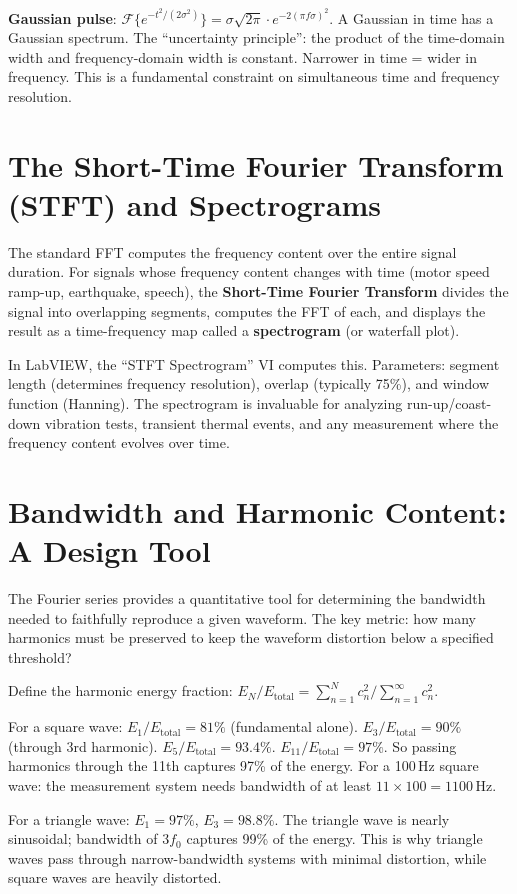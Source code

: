 \documentclass[11pt,letterpaper,twoside,openany]{book}
\begin{document}
\textbf{Gaussian pulse}: $\mathcal{F}\{e^{-t^2/(2\sigma^2)}\} = \sigma\sqrt{2\pi} \cdot e^{-2(\pi f\sigma)^2}$. A Gaussian in time has a Gaussian spectrum. The ``uncertainty principle'': the product of the time-domain width and frequency-domain width is constant. Narrower in time = wider in frequency. This is a fundamental constraint on simultaneous time and frequency resolution.

\section{The Short-Time Fourier Transform (STFT) and Spectrograms}
The standard FFT computes the frequency content over the entire signal duration. For signals whose frequency content changes with time (motor speed ramp-up, earthquake, speech), the \textbf{Short-Time Fourier Transform} divides the signal into overlapping segments, computes the FFT of each, and displays the result as a time-frequency map called a \textbf{spectrogram} (or waterfall plot).

In LabVIEW, the ``STFT Spectrogram'' VI computes this. Parameters: segment length (determines frequency resolution), overlap (typically 75\%), and window function (Hanning). The spectrogram is invaluable for analyzing run-up/coast-down vibration tests, transient thermal events, and any measurement where the frequency content evolves over time.
\section{Bandwidth and Harmonic Content: A Design Tool}
The Fourier series provides a quantitative tool for determining the bandwidth needed to faithfully reproduce a given waveform. The key metric: how many harmonics must be preserved to keep the waveform distortion below a specified threshold?

Define the harmonic energy fraction: $E_N / E_{\text{total}} = \sum_{n=1}^{N} c_n^2 / \sum_{n=1}^{\infty} c_n^2$.

For a square wave: $E_1/E_{\text{total}} = 81\%$ (fundamental alone). $E_3/E_{\text{total}} = 90\%$ (through 3rd harmonic). $E_5/E_{\text{total}} = 93.4\%$. $E_{11}/E_{\text{total}} = 97\%$. So passing harmonics through the 11th captures 97\% of the energy. For a 100\,Hz square wave: the measurement system needs bandwidth of at least $11 \times 100 = 1100$\,Hz.

For a triangle wave: $E_1 = 97\%$, $E_3 = 98.8\%$. The triangle wave is nearly sinusoidal; bandwidth of $3f_0$ captures 99\% of the energy. This is why triangle waves pass through narrow-bandwidth systems with minimal distortion, while square waves are heavily distorted.
\end{document}
